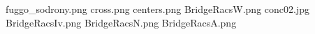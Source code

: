 fuggo_sodrony.png
cross.png
centers.png
BridgeRacsW.png
conc02.jpg
BridgeRacsIv.png
BridgeRacsN.png
BridgeRacsA.png
